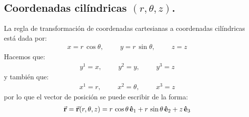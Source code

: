 \documentclass[hidelinks,12pt]{article}
\begin{document}
\subsection{Coordenadas cilíndricas \texorpdfstring{$(r, \theta, z)$.}{r, t, z}}

La regla de transformación de coordenadas cartesianas a coordenadas cilíndricas está dada por:
\begin{align*}
x = r \, \cos \theta, \hspace{1cm} y = r \, \sin \theta, \hspace{1cm} z = z
\end{align*}
Hacemos que:
\begin{align*}
y^{1} = x, \hspace{1cm} y^{2} = y, \hspace{1cm} y^{3} = z
\end{align*}
y también que:
\begin{align*}
x^{1} = r, \hspace{1cm} x^{2} = \theta, \hspace{1cm} x^{3} = z
\end{align*}
por lo que el vector de posición se puede escribir de la forma:
\begin{align*}
\va{r} = \va{r} (r, \theta, z) = r \, \cos \theta \, \vu{e}_{1} + r \, \sin \theta \, \vu{e}_{2} + z \, \vu{e}_{3}
\end{align*}
\end{document}

